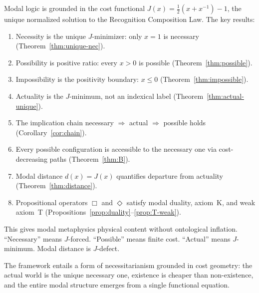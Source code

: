 \documentclass[12pt,a4paper]{article}
\theoremstyle{definition}
\theoremstyle{remark}
\begin{document}
Modal logic is grounded in the cost functional
$J(x) = \tfrac{1}{2}(x + x^{-1}) - 1$, the unique normalized solution
to the Recognition Composition Law.  The key results:
\begin{enumerate}
  \item Necessity is the unique $J$-minimizer: only $x = 1$ is
  necessary (Theorem~\ref{thm:unique-nec}).
  \item Possibility is positive ratio: every $x > 0$ is possible
  (Theorem~\ref{thm:possible}).
  \item Impossibility is the positivity boundary: $x \leq 0$
  (Theorem~\ref{thm:impossible}).
  \item Actuality is the $J$-minimum, not an indexical label
  (Theorem~\ref{thm:actual-unique}).
  \item The implication chain
  necessary $\Rightarrow$ actual $\Rightarrow$ possible holds
  (Corollary~\ref{cor:chain}).
  \item Every possible configuration is accessible to the necessary
  one via cost-decreasing paths (Theorem~\ref{thm:B}).
  \item Modal distance $d(x) = J(x)$ quantifies departure from
  actuality (Theorem~\ref{thm:distance}).
  \item Propositional operators $\Box$ and $\Diamond$ satisfy modal
  duality, axiom~K, and weak axiom~T
  (Propositions~\ref{prop:duality}--\ref{prop:T-weak}).
\end{enumerate}

This gives modal metaphysics physical content without ontological
inflation.  ``Necessary'' means $J$-forced.  ``Possible'' means
finite cost.  ``Actual'' means $J$-minimum.  Modal distance is
$J$-defect.

The framework entails a form of necessitarianism grounded in cost
geometry: the actual world is the unique necessary one, existence is
cheaper than non-existence, and the entire modal structure emerges from
a single functional equation.
\end{document}
